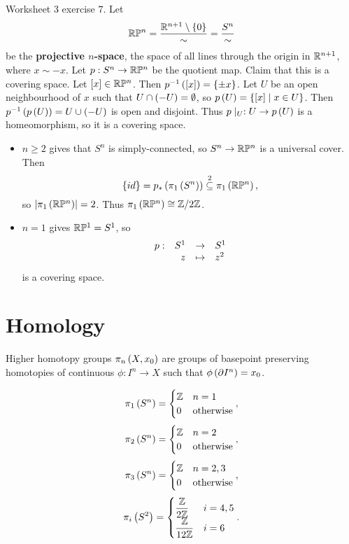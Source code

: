 \begin{example*}
Worksheet $ 3 $ exercise $ 7 $. Let
$$ \mathbb{R}\mathbb{P}^n = \dfrac{\mathbb{R}^{n + 1} \setminus \left\{ 0 \right\}}{\sim} = \dfrac{S^n}{\sim} $$
be the \textbf{projective $ n $-space}, the space of all lines through the origin in $ \mathbb{R}^{n + 1} $, where $ x \sim -x $. Let $ p : S^n \to \mathbb{R}\mathbb{P}^n $ be the quotient map. Claim that this is a covering space. Let $ \left[ x \right] \in \mathbb{R}\mathbb{P}^n $. Then $ p^{-1}\left( \left[ x \right] \right) = \left\{ \pm x \right\} $. Let $ U $ be an open neighbourhood of $ x $ such that $ U \cap \left( -U \right) = \emptyset $, so $ p\left( U \right) = \left\{ \left[ x \right] \mid x \in U \right\} $. Then $ p^{-1}\left( p\left( U \right) \right) = U \cup \left( -U \right) $ is open and disjoint. Thus $ p \mid_U : U \to p\left( U \right) $ is a homeomorphism, so it is a covering space.
\begin{itemize}
\item $ n \ge 2 $ gives that $ S^n $ is simply-connected, so $ S^n \to \mathbb{R}\mathbb{P}^n $ is a universal cover. Then
$$ \left\{ id \right\} = p_*\left( \pi_1\left( S^n \right) \right) \overset{2}{\subseteq} \pi_1\left( \mathbb{R}\mathbb{P}^n \right), $$
so $ \left\lvert \pi_1\left( \mathbb{R}\mathbb{P}^n \right) \right\rvert = 2 $. Thus $ \pi_1\left( \mathbb{R}\mathbb{P}^n \right) \cong \mathbb{Z} / 2\mathbb{Z} $.
\item $ n = 1 $ gives $ \mathbb{R}\mathbb{P}^1 = S^1 $, so
$$ \function[p]{S^1}{S^1}{z}{z^2} $$
is a covering space.
\end{itemize}
\end{example*}

\pagebreak

\section{Homology}


Higher homotopy groups $ \pi_n\left( X, x_0 \right) $ are groups of basepoint preserving homotopies of continuous $ \phi : I^n \to X $ such that $ \phi\left( \partial I^n \right) = x_0 $.

\begin{example*}
$$ \pi_1\left( S^n \right) =
\begin{cases}
\mathbb{Z} & n = 1 \\
0 & \text{otherwise}
\end{cases},
$$
$$ \pi_2\left( S^n \right) =
\begin{cases}
\mathbb{Z} & n = 2 \\
0 & \text{otherwise}
\end{cases},
$$
$$ \pi_3\left( S^n \right) =
\begin{cases}
\mathbb{Z} & n = 2, 3 \\
0 & \text{otherwise}
\end{cases},
$$
$$ \pi_i\left( S^2 \right) =
\begin{cases}
\dfrac{\mathbb{Z}}{2\mathbb{Z}} & i = 4, 5 \\
\dfrac{\mathbb{Z}}{12\mathbb{Z}} & i = 6
\end{cases}.
$$
\end{example*}

